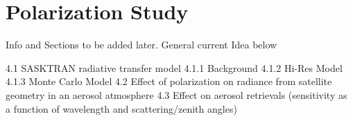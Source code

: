 \chapter{Polarization Study}

Info and Sections to be added later. General current Idea below

    4.1 SASKTRAN radiative transfer model
        4.1.1 Background
        4.1.2 Hi-Res Model
        4.1.3 Monte Carlo Model
    4.2 Effect of polarization on radiance from satellite geometry in an aerosol atmosphere
    4.3 Effect on aerosol retrievals (sensitivity as a function of wavelength and scattering/zenith angles)



 
